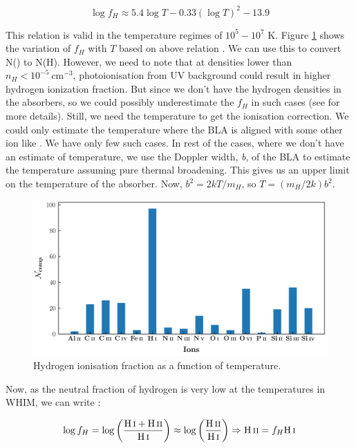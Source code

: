 \begin{equation} 
    \log f_H \approx 5.4 \log T - 0.33(\log T)^2 -13.9
\end{equation}

This relation is valid in the temperature regimes of $10^5-10^7$ K. Figure \ref{fig:fH} shows the variation of $f_H$ with $T$ based on above relation . We can use this to convert N() to N(H). However, we need to note that at densities lower than $n_H < 10^{-5} \ \text{cm}^{-3}$, photoionisation from UV background could result in higher hydrogen ionization fraction. But since we don't have the hydrogen densities in the absorbers, so we could possibly underestimate the $f_H$ in such cases (see \citet{Richter_2020, Fang-2001} for more details). Still, we need the temperature to get the ionisation correction. We could only estimate the temperature where the BLA is aligned with some other ion like . We have only few such cases. In rest of the cases, where we don't have an estimate of temperature, we use the Doppler width, \emph{b}, of the BLA to estimate the temperature assuming pure thermal broadening. This gives us an upper limit on the temperature of the absorber. Now, $b^2=2kT/m_H$, so $T=(m_H / 2k) b^2 $. 

\begin{figure}
    \centering
    \includegraphics[width=\linewidth]{Figures/ion-component.png}
    \caption{Hydrogen ionisation fraction as a function of temperature.}
    \label{fig:fH}
\end{figure}

Now, as the neutral fraction of hydrogen is very low at the temperatures in WHIM, we can write :

\begin{equation*}
     \log f_H = \log \left(\frac{\ion{H}{i}+\ion{H}{ii}}{\ion{H}{i}}\right) \approx \log \left(\frac{\ion{H}{ii}}{\ion{H}{i}}\right)  \Rightarrow  \ion{H}{ii}= f_H \ion{H}{i}
\end{equation*}


